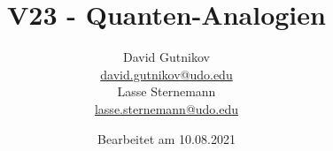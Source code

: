 

\title{V23 - Quanten-Analogien}
\author{
  David Gutnikov\\
  \href{mailto:david.gutnikov@udo.edu}{david.gutnikov@udo.edu}\\
  Lasse Sternemann\\
  \href{mailto:lasse.sternemann@udo.edu}{lasse.sternemann@udo.edu}
}
\date{Bearbeitet am 10.08.2021}


    \maketitle
    \newpage
    \tableofcontents
    \newpage

    
    
    

    \newpage
    \printbibliography


